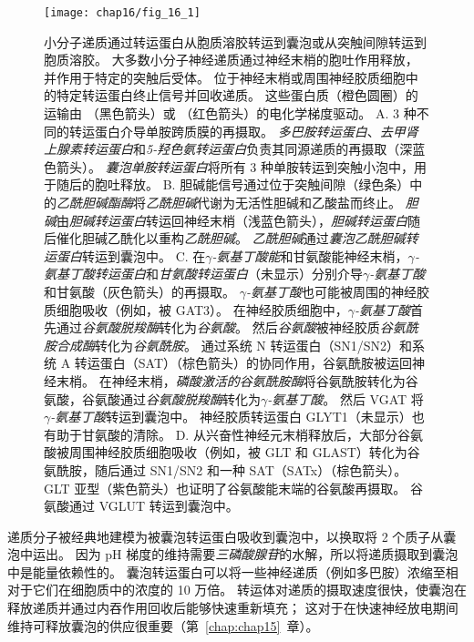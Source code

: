 \begin{figure}[htbp]
	\centering
	\texttt{[image: chap16/fig\_16\_1]}
	\caption{小分子递质通过转运蛋白从胞质溶胶转运到囊泡或从突触间隙转运到胞质溶胶。
		大多数小分子神经递质通过神经末梢的胞吐作用释放，并作用于特定的突触后受体。
		位于神经末梢或周围神经胶质细胞中的特定转运蛋白终止信号并回收递质。
		这些蛋白质（橙色圆圈）的运输由 （黑色箭头）或 （红色箭头）的电化学梯度驱动\cite{chaudhry2008pharmacology}。
		A. 3 种不同的转运蛋白介导单胺跨质膜的再摄取。
		\textit{多巴胺转运蛋白}、\textit{去甲肾上腺素转运蛋白}和\textit{5-羟色氨转运蛋白}负责其同源递质的再摄取（深蓝色箭头）。
		\textit{囊泡单胺转运蛋白}将所有 3 种单胺转运到突触小泡中，用于随后的胞吐释放。
		B. 胆碱能信号通过位于突触间隙（绿色条）中的\textit{乙酰胆碱酯酶}将\textit{乙酰胆碱}代谢为无活性胆碱和乙酸盐而终止。
		\textit{胆碱}由\textit{胆碱转运蛋白}转运回神经末梢（浅蓝色箭头），\textit{胆碱转运蛋白}随后催化胆碱乙酰化以重构\textit{乙酰胆碱}。
		\textit{乙酰胆碱}通过\textit{囊泡乙酰胆碱转运蛋白}转运到囊泡中。
		C. 在\textit{$\gamma$-氨基丁酸能}和甘氨酸能神经末梢，\textit{$\gamma$-氨基丁酸转运蛋白}和\textit{甘氨酸转运蛋白}（未显示）分别介导\textit{$\gamma$-氨基丁酸}和甘氨酸（灰色箭头）的再摄取。
		\textit{$\gamma$-氨基丁酸}也可能被周围的神经胶质细胞吸收（例如，被 GAT3）。
		在神经胶质细胞中，\textit{$\gamma$-氨基丁酸}首先通过\textit{谷氨酸脱羧酶}转化为\textit{谷氨酸}。
		然后\textit{谷氨酸}被神经胶质\textit{谷氨酰胺合成酶}转化为\textit{谷氨酰胺}。
		通过系统 N 转运蛋白（SN1/SN2）和系统 A 转运蛋白（SAT）（棕色箭头）的协同作用，谷氨酰胺被运回神经末梢。
		在神经末梢，\textit{磷酸激活的谷氨酰胺酶}将谷氨酰胺转化为谷氨酸，谷氨酸通过\textit{谷氨酸脱羧酶}转化为\textit{$\gamma$-氨基丁酸}。
		然后 VGAT 将\textit{$\gamma$-氨基丁酸}转运到囊泡中。
		神经胶质转运蛋白 GLYT1（未显示）也有助于甘氨酸的清除。
		D. 从兴奋性神经元末梢释放后，大部分谷氨酸被周围神经胶质细胞吸收（例如，被 GLT 和 GLAST）转化为谷氨酰胺，随后通过 SN1/SN2 和一种 SAT（SATx）（棕色箭头）。
		GLT 亚型（紫色箭头）也证明了谷氨酸能末端的谷氨酸再摄取。 谷氨酸通过 VGLUT 转运到囊泡中。}
	\label{fig:16_1}
\end{figure}


递质分子被经典地建模为被囊泡转运蛋白吸收到囊泡中，以换取将 2 个质子从囊泡中运出。
因为 pH 梯度的维持需要\textit{三磷酸腺苷}的水解，所以将递质摄取到囊泡中是能量依赖性的。
囊泡转运蛋白可以将一些神经递质（例如多巴胺）浓缩至相对于它们在细胞质中的浓度的 10 万倍。
转运体对递质的摄取速度很快，使囊泡在释放递质并通过内吞作用回收后能够快速重新填充；
这对于在快速神经放电期间维持可释放囊泡的供应很重要（第~\ref{chap:chap15}~章）。


